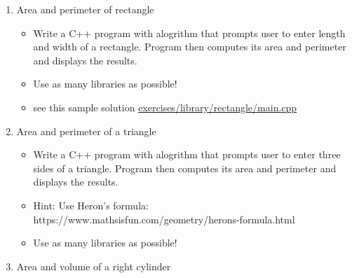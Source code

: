 \documentclass[11pt]{article}
\providecommand{\tightlist}{%
      \setlength{\itemsep}{0pt}\setlength{\parskip}{0pt}}
\begin{document}
\begin{enumerate}
\def\labelenumi{\arabic{enumi}.}
\tightlist
\item
  Area and perimeter of rectangle

  \begin{itemize}
  \tightlist
  \item
    Write a C++ program with alogrithm that prompts user to enter length
    and width of a rectangle. Program then computes its area and
    perimeter and displays the results.
  \item
    Use as many libraries as possible!
  \item
    see this sample solution \url{exercises/library/rectangle/main.cpp}
  \end{itemize}
\item
  Area and perimeter of a triangle

  \begin{itemize}
  \tightlist
  \item
    Write a C++ program with alogrithm that prompts user to enter three
    sides of a triangle. Program then computes its area and perimeter
    and displays the results.
  \item
    Hint: Use Heron's formula:
    https://www.mathsisfun.com/geometry/herons-formula.html
  \item
    Use as many libraries as possible!
  \end{itemize}
\item
  Area and volume of a right cylinder


\end{enumerate}
\end{document}
